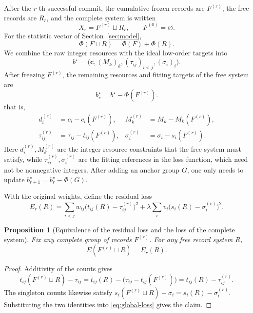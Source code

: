 \documentclass[11pt,a4paper]{article}
\numberwithin{equation}{section}
\newtheorem{proposition}{Proposition}[section]
\theoremstyle{definition}
\numberwithin{algorithm}{section}
\begin{document}
After the $r$-th successful commit, the cumulative frozen records are $F^{(r)}$, the free
records are $R_r$, and the complete system is written
\begin{equation}
X_r=F^{(r)}\sqcup R_r,\qquad F^{(0)}=\varnothing.
\label{eq:recursive-split}
\end{equation}
For the statistic vector of Section~\ref{sec:model},
\begin{equation}
\Phi(F\sqcup R)=\Phi(F)+\Phi(R).
\label{eq:stat-add}
\end{equation}
We combine the raw integer resources with the ideal low-order targets into
\begin{equation}
b^\star=\bigl(\boldsymbol c,(M_k)_k,
(\tau_{ij})_{i<j},(\sigma_i)_i\bigr).
\label{eq:original-budget}
\end{equation}
After freezing $F^{(r)}$, the remaining resources and fitting targets of the free system are
\begin{equation}
\boxed{\quad b_r^\star=b^\star-\Phi(F^{(r)}).\quad}
\label{eq:budget-subtraction}
\end{equation}
that is,
\begin{equation}
\begin{aligned}
d_i^{(r)}&=c_i-c_i(F^{(r)}),&
M_k^{(r)}&=M_k-M_k(F^{(r)}),\\
\tau_{ij}^{(r)}&=\tau_{ij}-t_{ij}(F^{(r)}),&
\sigma_i^{(r)}&=\sigma_i-s_i(F^{(r)}).
\end{aligned}
\label{eq:residual-targets}
\end{equation}
Here $d_i^{(r)},M_k^{(r)}$ are the integer resource constraints that the free system must
satisfy, while $\tau_{ij}^{(r)},\sigma_i^{(r)}$ are the fitting references in the loss
function, which need not be nonnegative integers.
After adding an anchor group $G$, one only needs to update
$b_{r+1}^\star=b_r^\star-\Phi(G)$.

With the original weights, define the residual loss
\begin{equation}
E_r(R)=
\sum_{i<j}w_{ij}\bigl(t_{ij}(R)-\tau_{ij}^{(r)}\bigr)^2+
\lambda\sum_i v_i\bigl(s_i(R)-\sigma_i^{(r)}\bigr)^2.
\label{eq:residual-loss}
\end{equation}

\begin{proposition}[Equivalence of the residual loss and the loss of the complete system]
\label{prop:residual-equivalence}
Fix any complete group of records $F^{(r)}$.
For any free record system $R$,
\begin{equation}
\boxed{\ E(F^{(r)}\sqcup R)=E_r(R).\ }
\label{eq:loss-equivalence}
\end{equation}
\end{proposition}
\begin{proof}
Additivity of the counts gives
\[
t_{ij}(F^{(r)}\sqcup R)-\tau_{ij}
=t_{ij}(R)-\bigl(\tau_{ij}-t_{ij}(F^{(r)})\bigr)
=t_{ij}(R)-\tau_{ij}^{(r)}.
\]
The singleton counts likewise satisfy
$s_i(F^{(r)}\sqcup R)-\sigma_i=s_i(R)-\sigma_i^{(r)}$.
Substituting the two identities into \eqref{eq:global-loss} gives the claim.
\end{proof}
\end{document}

